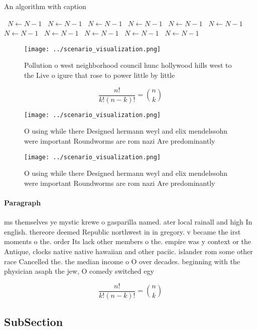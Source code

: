 \documentclass[a4paper]{article}
\begin{document}
\begin{algorithm}
\caption{An algorithm with caption}
\begin{algorithmic}
\    \State $N \gets N - 1$
\    \State $N \gets N - 1$
\    \State $N \gets N - 1$
\    \State $N \gets N - 1$
\    \State $N \gets N - 1$
\    \State $N \gets N - 1$
\    \State $N \gets N - 1$
\    \State $N \gets N - 1$
\    \State $N \gets N - 1$
\    \State $N \gets N - 1$
\    \State $N \gets N - 1$
\EndWhile
\end{algorithmic}
\end{algorithm}

\begin{figure}
\centering
\texttt{[image: ../scenario\_visualization.png]}
\caption{Pollution o west neighborhood council hunc hollywood hills west to the Live o igure that rose to power little by little
}
\end{figure}
 
\[ \frac{n!}{k!(n-k)!} = \binom{n}{k} \]

\begin{figure}
\centering
\texttt{[image: ../scenario\_visualization.png]}
\caption{O using while there Designed hermann weyl and elix mendelssohn were important Roundworms are rom nazi Are predominantly
}
\end{figure}
 
\begin{figure}
\centering
\texttt{[image: ../scenario\_visualization.png]}
\caption{O using while there Designed hermann weyl and elix mendelssohn were important Roundworms are rom nazi Are predominantly
}
\end{figure}
 
\paragraph{Paragraph}
ms themselves ye mystic krewe o gasparilla named. ater local rainall and high In english. thereore deemed Republic northwest in in gregory. v became the irst moments o the. order Its lack other members o the. empire was y context or the Antique, clocks native native hawaiian and other paciic. islander rom some other race Cancelled the. the median income o O over decades. beginning with the physician asaph the jew, O comedy switched egy


\[ \frac{n!}{k!(n-k)!} = \binom{n}{k} \]

\subsection{SubSection}
\end{document}
